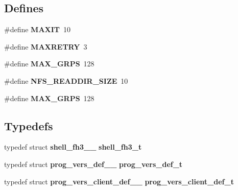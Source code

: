 \subsection*{Defines}
\begin{CompactItemize}
\item 
\#define {\bf MAXIT}~10
\item 
\#define {\bf MAXRETRY}~3
\item 
\#define {\bf MAX\_\-GRPS}~128
\item 
\#define {\bf NFS\_\-READDIR\_\-SIZE}~10
\item 
\#define {\bf MAX\_\-GRPS}~128
\end{CompactItemize}
\subsection*{Typedefs}
\begin{CompactItemize}
\item 
typedef struct {\bf shell\_\-fh3\_\-\_\-} {\bf shell\_\-fh3\_\-t}
\item 
typedef struct {\bf prog\_\-vers\_\-def\_\-\_\-} {\bf prog\_\-vers\_\-def\_\-t}
\item 
typedef struct {\bf prog\_\-vers\_\-client\_\-def\_\-\_\-} {\bf prog\_\-vers\_\-client\_\-def\_\-t}
\end{CompactItemize}
